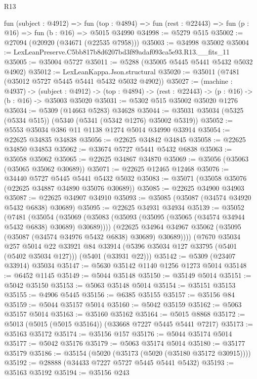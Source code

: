 \begin{lexlean}{R13}
\begin{coremodule}
  fun (subject : @4912) =>
  fun (top : @4894) => fun (rest : @22443) => fun (p : @16) => fun (b : @16) => @5015 @34990
@34998 := @5279 @515
@35002 := @27094 (@20920 (@34671 (@22535 @7958)))
@35003 := @34998 @35002
@35004 := LexLeanPreserve.C5bb817b8d6207bd3f89adaf093ca5e93.R13.__fits_11
@35005 := @35004 @5727
@35011 := @5288 (@35005 @5445 @5441 @5432 @5032 @4902)
@35012 := LexLeanKappa.Json.structural
@35020 := @35011 (@7481 (@35012 @5727 @5445 @5441 @5432 @5032 @4902))
@35027 := (machine : @4937) ->
  (subject : @4912) -> (top : @4894) -> (rest : @22443) -> (p : @16) -> (b : @16) -> @35003 @35020
@35031 := @5302 @515 @35002 @35020 @1276
@35034 := @5309 (@14663 @5283) @34628
@35044 := @35031 @35034 (@5325 (@5334 @515)) (@5340 (@5341 (@5342 @1276) @35002 @5319))
@35052 := @5553 @35034 @386 @11 @1138 @1274 @5014 @34990 @33914
@35054 := @22625 @34835 @34838
@35056 := @22625 @34842 @34845
@35058 := @22625 @34850 @34853
@35062 := @33674 @5727 @5441 @5432 @6838
@35063 := @35058 @35062
@35065 := @22625 @34867 @34870
@35069 := @35056 (@35063 (@35065 @35062 @30689))
@35071 := @22625 @12465 @12468
@35076 := @34440 @5727 @5445 @5441 @5432 @5032
@35083 := @35071 (@35058 @35076 (@22625 @34887 @34890 @35076 @30689))
@35085 := @22625 @34900 @34903
@35087 := @22625 @34907 @34910
@35093 := @35085 (@35087 (@34574 @34920 @5432 @6838) @30689)
@35095 := @22625 @34931 @34934
@35139 := @35052
    (@7481
      (@35054
        (@35069 (@35083 (@35093 (@35095 (@35065 (@34574 @34944 @5432 @6838) @30689) @30689))))
        (@22625 @34964 @34967 @35062 (@35095 (@35087 (@34574 @34976 @5432 @6838) @30689) @30689))))
    (@7670
      @35034
      @257
      @5014
      @22
      @33921
      @84
      @33914
      (@5396 @35034 @127 @33795 (@5401 (@5402 @35034 @127)))
      (@5401 (@33931 @22)))
@35142 := @5309 (@23407 @33914) @35034
@35147 := @5630 @35142 @1140 @1256 @1273 @5014
@35148 := @6452 @1145
@35149 := @5044 @35148
@35150 := @35149 @5014
@35151 := @5042 @35150
@35153 := @5063 @35148 @5014
@35154 := @35151 @35153
@35155 := @4906 @5445
@35156 := @6385 @35155
@35157 := @35156 @84
@35159 := @5044 @35157 @5014
@35160 := @5042 @35159
@35162 := @5063 @35157 @5014
@35163 := @35160 @35162
@35164 := @5015 @8868
@35172 := @5013 (@5015 (@5015 @35164)) (@33668 @7227 @5445 @5441 @7217)
@35173 := @35163 @35172
@35174 := @35156 @157
@35176 := @5044 @35174 @5014
@35177 := @5042 @35176
@35179 := @5063 @35174 @5014
@35180 := @35177 @35179
@35186 := @35154 (@5020 (@35173 (@5020 (@35180 @35172 @30915))))
@35192 := @28888 (@34433 @7227 @5727 @5445 @5441 @5432)
@35193 := @35163 @35192
@35194 := @35156 @243

\end{coremodule}
\end{lexlean}
